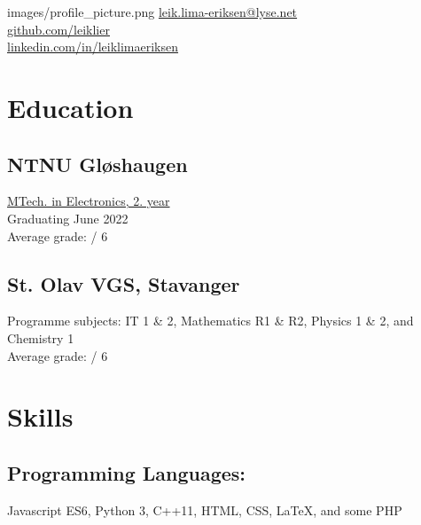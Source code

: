 \documentclass[]{resume-build}
\begin{document}
%
%

{images/profile_picture.png}
{
	\faEnvelope \href{mailto:leik.lima-eriksen@lyse.net}{\hspace{0.5em}leik.lima-eriksen@lyse.net}\\
	\faGithub \href{https://github.com/leiklier}{\hspace{0.5em}github.com/leiklier}\\
	\faLinkedin \href{https://www.linkedin.com/in/leiklimaeriksen}{\hspace{0.5em}linkedin.com/in/leiklimaeriksen}
}
    
%
%
\begin{minipage}[t]{0.34\textwidth} 
  
\section{Education} 

\subsection{NTNU Gløshaugen}
\href{https://www.ntnu.no/studier/mtelsys}{MTech. in Electronics, 2. year} \\
Graduating June 2022 \\
Average grade:  / 6 \\
\sectionsep

\subsection{St. Olav VGS, Stavanger}
Programme subjects: IT 1 \& 2, Mathematics R1 \& R2, Physics 1 \& 2, and Chemistry 1 \\
Average grade:  / 6 \\
\sectionsep

\section{Skills}
\subsection{Programming Languages:}
Javascript ES6, Python 3, C++11, HTML, CSS, LaTeX, and some PHP
\subsectionsep


\end{minipage}
\end{document}
